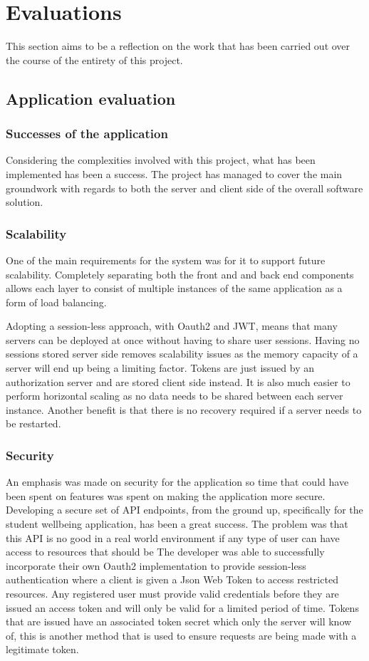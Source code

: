 \section{Evaluations}

This section aims to be a reflection on the work that has been carried out over the course of the entirety of this project.

\subsection{Application evaluation}

\subsubsection{Successes of the application}
Considering the complexities involved with this project, what has been implemented has been a success.
The project has managed to cover the main groundwork with regards to both the server and client side of the overall 
software solution.


\subsubsection*{Scalability}
One of the main requirements for the system was for it to support future scalability.
Completely separating both the front and and back end components allows each layer to consist of multiple instances of the same application as 
a form of load balancing.

Adopting a session-less approach, with Oauth2 and JWT, means that many servers can be deployed at once without having to share user sessions.
Having no sessions stored server side removes scalability issues as the memory capacity of a server will end up being a limiting factor.
Tokens are just issued by an authorization server and are stored client side instead.
It is also much easier to perform horizontal scaling as no data needs to be shared between each server instance.
Another benefit is that there is no recovery required if a server needs to be restarted.

\subsubsection*{Security}
An emphasis was made on security for the application so time that could have been spent on features was spent on making the application more secure.
Developing a secure set of API endpoints, from the ground up, specifically for the student wellbeing application, has been a great success.
The problem was that this API is no good in a real world environment if any type of user can have access to resources that should be 
The developer was able to successfully incorporate their own Oauth2 implementation to provide session-less authentication where a client is given
a Json Web Token to access restricted resources.
Any registered user must provide valid credentials before they are issued an access token and will only be valid for a limited period of time.
Tokens that are issued have an associated token secret which only the server will know of, this is another method that is used to ensure requests are 
being made with a legitimate token.

